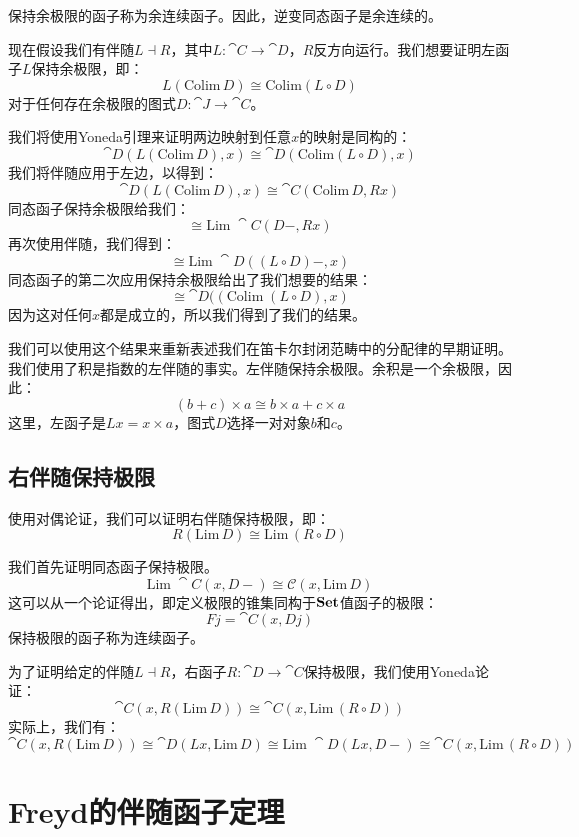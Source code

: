 \documentclass[DaoFP]{subfiles}
\begin{document}
    保持余极限的函子称为余连续函子。因此，逆变同态函子是余连续的。

    现在假设我们有伴随$L \dashv R$，其中$L \colon \cat C \to \cat D$，$R$反方向运行。我们想要证明左函子$L$保持余极限，即：
    \[ L (\text{Colim} \, D) \cong \text{Colim} (L \circ D) \]
    对于任何存在余极限的图式$D \colon \cat J \to \cat C$。

    我们将使用Yoneda引理来证明两边映射到任意$x$的映射是同构的：
    \[ \cat D( L (\text{Colim} \, D), x) \cong \cat D (\text{Colim} (L \circ D), x) \]
    我们将伴随应用于左边，以得到：
    \[ \cat D( L (\text{Colim} \, D), x) \cong \cat C (\text{Colim}\, D, R x) \]
    同态函子保持余极限给我们：
    \[ \cong \text{Lim}\; \cat C(D -, R x) \]
    再次使用伴随，我们得到：
    \[ \cong \text{Lim}\; \cat D((L \circ D) -, x) \]
    同态函子的第二次应用保持余极限给出了我们想要的结果：
    \[ \cong  \cat D((\text{Colim}\;(L \circ D), x) \]
    因为这对任何$x$都是成立的，所以我们得到了我们的结果。

    我们可以使用这个结果来重新表述我们在笛卡尔封闭范畴中的分配律的早期证明。我们使用了积是指数的左伴随的事实。左伴随保持余极限。余积是一个余极限，因此：
    \[(b + c) \times a \cong b \times a + c \times a \]
    这里，左函子是$L x = x \times a$，图式$D$选择一对对象$b$和$c$。

    \subsection{右伴随保持极限}

    使用对偶论证，我们可以证明右伴随保持极限，即：
    \[ R (\text{Lim}\, D) \cong \text{Lim}\, (R \circ D) \]

    我们首先证明同态函子保持极限。
    \[ \text{Lim}\; \cat C( x, D-) \cong \mathcal{C}(x, \text{Lim}\,D) \]
    这可以从一个论证得出，即定义极限的锥集同构于$\mathbf{Set}$值函子的极限：
    \[ F j = \cat C(x, D j) \]
    保持极限的函子称为连续函子。

    为了证明给定的伴随$L \dashv R$，右函子$R \colon \cat D \to \cat C$保持极限，我们使用Yoneda论证：
    \[ \cat C(x, R (\text{Lim}\, D)) \cong \cat C (x, \text{Lim}\, (R \circ D)) \]
    实际上，我们有：
    \[ \cat C(x, R (\text{Lim}\, D)) \cong \cat D(L x, \text{Lim}\, D) \cong \text{Lim}\; \cat D(L x, D-) \cong \cat C(x, \text{Lim}\, (R \circ D))\]


    \section{Freyd的伴随函子定理}
\end{document}
